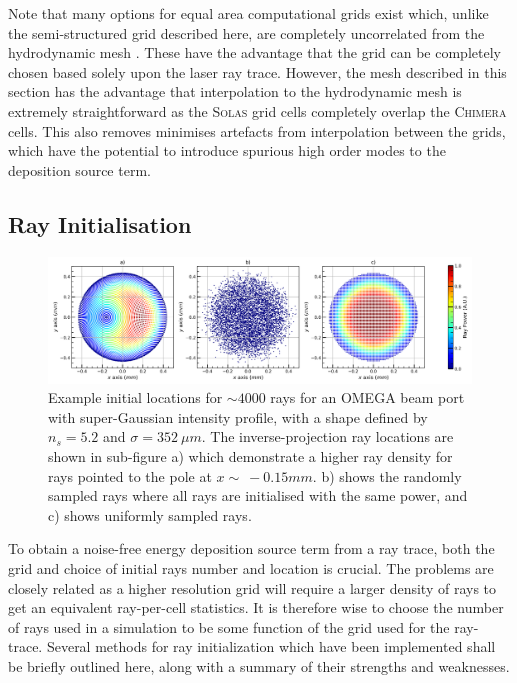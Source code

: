 Note that many options for equal area computational grids exist which, unlike the semi-structured grid described here, are completely uncorrelated from the hydrodynamic mesh \cite{cheong_eigensolutions_2015,malkin_new_2019}.
These have the advantage that the grid can be completely chosen based solely upon the laser ray trace.
However, the mesh described in this section has the advantage that interpolation to the hydrodynamic mesh is extremely straightforward as the \textsc{Solas} grid cells completely overlap the \textsc{Chimera} cells.
This also removes minimises artefacts from interpolation between the grids, which have the potential to introduce spurious high order modes to the deposition source term.

\subsection{Ray Initialisation}
\label{sec:SOLAS_ray_init}

\begin{figure}[t!]
    \includegraphics[width=14.5cm]{Numerics/Images/ray_init_plots.png}
    \centering
    \caption{Example initial locations for $\sim4000$ rays for an OMEGA beam port with super-Gaussian intensity profile, with a shape defined by $n_s=5.2$ and $\sigma=352\ \mu m$.
    The inverse-projection ray locations are shown in sub-figure a) which demonstrate a higher ray density for rays pointed to the pole at $x\sim\  -0.15 mm$.
    b) shows the randomly sampled rays where all rays are initialised with the same power, and c) shows uniformly sampled rays.}
    \label{fig:SOLAS_ray_init}
\end{figure}

To obtain a noise-free energy deposition source term from a ray trace, both the grid and choice of initial rays number and location is crucial.
The problems are closely related as a higher resolution grid will require a larger density of rays to get an equivalent ray-per-cell statistics.
It is therefore wise to choose the number of rays used in a simulation to be some function of the grid used for the ray-trace.
Several methods for ray initialization which have been implemented shall be briefly outlined here, along with a summary of their strengths and weaknesses.

